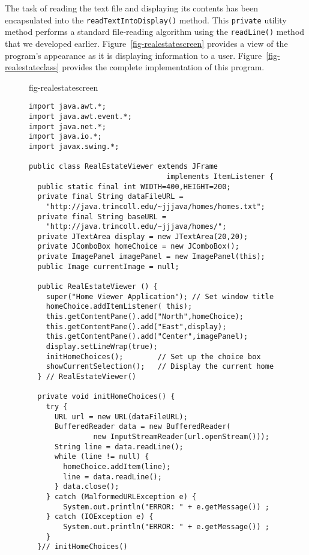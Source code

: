 The task of reading the text file and displaying its contents has been
encapsulated into the {\tt readTextIntoDisplay()} method.  This
{\tt private} utility method performs a standard file-reading algorithm
using the {\tt readLine()} method that we developed
earlier.  Figure~\ref{fig-realestatescreen}
provides a view of the program's appearance as it is displaying
information to a user. Figure~\ref{fig-realestateclass} provides the complete
implementation of this program.

\begin{figure}[hbt]
{fig-realestatescreen}
\end{figure}

\begin{figure}[p]
\jjjprogstart
\begin{jjjlisting}
\begin{lstlisting}
import java.awt.*;
import java.awt.event.*;
import java.net.*;
import java.io.*;
import javax.swing.*;

public class RealEstateViewer extends JFrame 
                                implements ItemListener {
  public static final int WIDTH=400,HEIGHT=200;
  private final String dataFileURL =
    "http://java.trincoll.edu/~jjjava/homes/homes.txt";
  private final String baseURL = 
    "http://java.trincoll.edu/~jjjava/homes/";
  private JTextArea display = new JTextArea(20,20);
  private JComboBox homeChoice = new JComboBox();
  private ImagePanel imagePanel = new ImagePanel(this);
  public Image currentImage = null;

  public RealEstateViewer () {
    super("Home Viewer Application"); // Set window title
    homeChoice.addItemListener( this);
    this.getContentPane().add("North",homeChoice);
    this.getContentPane().add("East",display);
    this.getContentPane().add("Center",imagePanel);
    display.setLineWrap(true);
    initHomeChoices();        // Set up the choice box
    showCurrentSelection();   // Display the current home
  } // RealEstateViewer()

  private void initHomeChoices() {
    try {
      URL url = new URL(dataFileURL);
      BufferedReader data = new BufferedReader(
               new InputStreamReader(url.openStream()));
      String line = data.readLine();
      while (line != null) {
        homeChoice.addItem(line);
        line = data.readLine();
      } data.close();
    } catch (MalformedURLException e) {
        System.out.println("ERROR: " + e.getMessage()) ;
    } catch (IOException e) {
        System.out.println("ERROR: " + e.getMessage()) ;
    }
  }// initHomeChoices()
\end{lstlisting}
\end{jjjlisting}
\end{figure}


